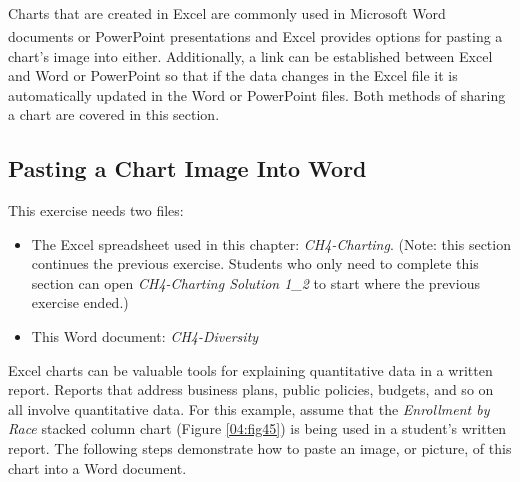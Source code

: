 Charts that are created in Excel are commonly used in Microsoft Word\textsuperscript{\textregistered} documents or PowerPoint\textsuperscript{\textregistered} presentations and Excel provides options for pasting a chart's image into either. Additionally, a link can be established between Excel and Word or PowerPoint so that if the data changes in the Excel file it is automatically updated in the Word or PowerPoint files. Both methods of sharing a chart are covered in this section.

\subsection{Pasting a Chart Image Into Word}

This exercise needs two files:

\begin{itemize}
	\item The Excel spreadsheet used in this chapter: \textit{CH4-Charting}. (Note: this section continues the previous exercise. Students who only need to complete this section can open \textit{CH4-Charting Solution 1\_2} to start where the previous exercise ended.)
	\item This Word document: \textit{CH4-Diversity}
\end{itemize}

Excel charts can be valuable tools for explaining quantitative data in a written report. Reports that address business plans, public policies, budgets, and so on all involve quantitative data. For this example, assume that the \textit{Enrollment by Race} stacked column chart (Figure \ref{04:fig45}) is being used in a student's written report. The following steps demonstrate how to paste an image, or picture, of this chart into a Word document.

